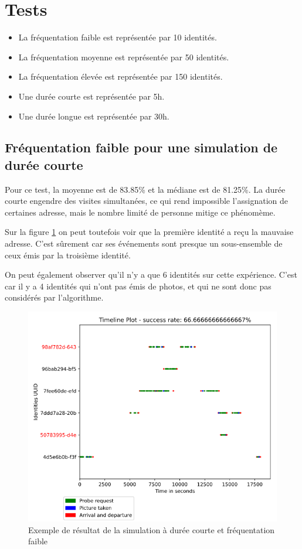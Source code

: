 \section{Tests}
\begin{itemize}
    \item La fréquentation faible est représentée par 10 identités.
    \item La fréquentation moyenne est représentée par 50 identités.
    \item La fréquentation élevée est représentée par 150 identités.
\end{itemize}
\begin{itemize}
    \item Une durée courte est représentée par 5h.
    \item Une durée longue est représentée par 30h.
\end{itemize}


\subsection{Fréquentation faible pour une simulation de durée courte}
Pour ce test, la moyenne est de 83.85\% et la médiane est de 81.25\%.
La durée courte engendre des visites simultanées, ce qui rend impossible l'assignation de certaines adresse, mais
le nombre limité de personne mitige ce phénomème. 

Sur la figure \ref{fig:simulation-short-low} on peut toutefois voir que la première identité a reçu la mauvaise adresse.
C'est sûrement car ses événements sont presque un sous-ensemble de ceux émis par la troisième identité.

On peut également observer qu'il n'y a que 6 identités sur cette expérience. C'est car il y a 4 identités
qui n'ont pas émis de photos, et qui ne sont donc pas considérés par l'algorithme.

\begin{figure}[H]
	\centering
	\includegraphics[width=12cm]{images/tests/exemple_courte_faible.png}
	\caption{Exemple de résultat de la simulation à durée courte et fréquentation faible}
	\label{fig:simulation-short-low}
\end{figure}

